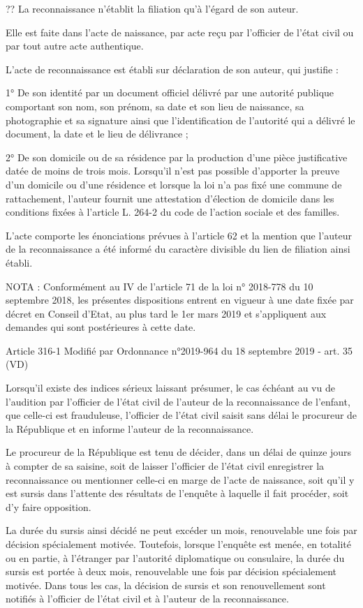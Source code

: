 \documentclass[
  12pt,
]{book}
\begin{document}
\begin{encadre}{??}
La reconnaissance n'établit la filiation qu'à l'égard de son auteur.

Elle est faite dans l'acte de naissance, par acte reçu par l'officier de l'état civil ou par tout autre acte authentique.

L'acte de reconnaissance est établi sur déclaration de son auteur, qui justifie :

1° De son identité par un document officiel délivré par une autorité publique comportant son nom, son prénom, sa date et son lieu de naissance, sa photographie et sa signature ainsi que l'identification de l'autorité qui a délivré le document, la date et le lieu de délivrance ;

2° De son domicile ou de sa résidence par la production d'une pièce justificative datée de moins de trois mois. Lorsqu'il n'est pas possible d'apporter la preuve d'un domicile ou d'une résidence et lorsque la loi n'a pas fixé une commune de rattachement, l'auteur fournit une attestation d'élection de domicile dans les conditions fixées à l'article L. 264-2 du code de l'action sociale et des familles.

L'acte comporte les énonciations prévues à l'article 62 et la mention que l'auteur de la reconnaissance a été informé du caractère divisible du lien de filiation ainsi établi.

NOTA :
Conformément au IV de l'article 71 de la loi n° 2018-778 du 10 septembre 2018, les présentes dispositions entrent en vigueur à une date fixée par décret en Conseil d'Etat, au plus tard le 1er mars 2019 et s'appliquent aux demandes qui sont postérieures à cette date.

Article 316-1
Modifié par Ordonnance n°2019-964 du 18 septembre 2019 - art. 35 (VD)

Lorsqu'il existe des indices sérieux laissant présumer, le cas échéant au vu de l'audition par l'officier de l'état civil de l'auteur de la reconnaissance de l'enfant, que celle-ci est frauduleuse, l'officier de l'état civil saisit sans délai le procureur de la République et en informe l'auteur de la reconnaissance.

Le procureur de la République est tenu de décider, dans un délai de quinze jours à compter de sa saisine, soit de laisser l'officier de l'état civil enregistrer la reconnaissance ou mentionner celle-ci en marge de l'acte de naissance, soit qu'il y est sursis dans l'attente des résultats de l'enquête à laquelle il fait procéder, soit d'y faire opposition.

La durée du sursis ainsi décidé ne peut excéder un mois, renouvelable une fois par décision spécialement motivée. Toutefois, lorsque l'enquête est menée, en totalité ou en partie, à l'étranger par l'autorité diplomatique ou consulaire, la durée du sursis est portée à deux mois, renouvelable une fois par décision spécialement motivée. Dans tous les cas, la décision de sursis et son renouvellement sont notifiés à l'officier de l'état civil et à l'auteur de la reconnaissance.


\end{encadre}
\end{document}
